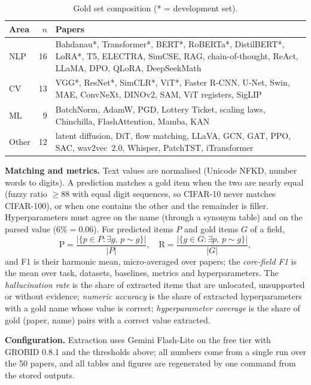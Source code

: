 \documentclass[conference]{IEEEtran}
\begin{document}
\begin{table}[t]
\caption{Gold set composition (* = development set).}
\label{tab:gold}
\centering
\footnotesize
\setlength{\tabcolsep}{3pt}
\begin{tabular}{@{}lrp{57mm}@{}}
\toprule
Area & $n$ & Papers \\
\midrule
NLP & 16 & Bahdanau*, Transformer*, BERT*, RoBERTa*, DistilBERT*, LoRA*, T5, ELECTRA, SimCSE, RAG, chain-of-thought, ReAct, LLaMA, DPO, QLoRA, DeepSeekMath \\
CV & 13 & VGG*, ResNet*, SimCLR*, ViT*, Faster R-CNN, U-Net, Swin, MAE, ConvNeXt, DINOv2, SAM, ViT registers, SigLIP \\
ML & 9 & BatchNorm, AdamW, PGD, Lottery Ticket, scaling laws, Chinchilla, FlashAttention, Mamba, KAN \\
Other & 12 & latent diffusion, DiT, flow matching, LLaVA, GCN, GAT, PPO, SAC, wav2vec~2.0, Whisper, PatchTST, iTransformer \\
\bottomrule
\end{tabular}
\end{table}

\textbf{Matching and metrics.} Text values are normalised (Unicode NFKD, number words to
digits). A prediction matches a gold item when the two are nearly equal (fuzzy ratio
$\geq 88$ with equal digit sequences, so CIFAR-10 never matches CIFAR-100), or when one
contains the other and the remainder is filler. Hyperparameters must agree on the name
(through a synonym table) and on the parsed value ($6\% = 0.06$). For predicted items $P$
and gold items $G$ of a field,
\begin{equation}
  \mathrm{P} = \frac{|\{p\in P : \exists g,\, p \sim g\}|}{|P|}, \quad
  \mathrm{R} = \frac{|\{g\in G : \exists p,\, p \sim g\}|}{|G|},
\end{equation}
and F1 is their harmonic mean, micro-averaged over papers; the \emph{core-field F1} is the
mean over task, datasets, baselines, metrics and hyperparameters. The \emph{hallucination
rate} is the share of extracted items that are unlocated, unsupported or without evidence;
\emph{numeric accuracy} is the share of extracted hyperparameters with a gold name whose
value is correct; \emph{hyperparameter coverage} is the share of gold (paper, name) pairs
with a correct value extracted.

\textbf{Configuration.} Extraction uses Gemini Flash-Lite on the free tier with GROBID 0.8.1
and the thresholds above; all numbers come from a single run over the 50 papers, and all
tables and figures are regenerated by one command from the stored outputs.
\end{document}
